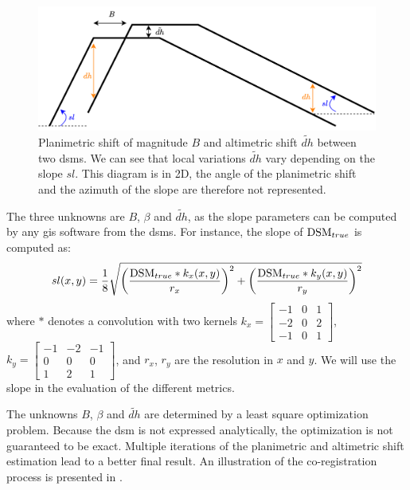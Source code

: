 \begin{figure}[ht!]
    \centering
    \includegraphics[width=\linewidth]{Images/Chap_6/Coregistration.png}
    \caption{Planimetric shift of magnitude $B$ and altimetric shift $\tilde{dh}$ between two \acrshort{dsm}s. We can see that local variations $\tilde{dh}$ vary depending on the slope $sl$. This diagram is in 2D, the angle of the planimetric shift and the azimuth of the slope are therefore not represented.}
    \label{fig:coregistration}
\end{figure}

The three unknowns are $B$, $\beta$ and $\tilde{dh}$, as the slope parameters can be computed by any \acrshort{gis} software from the \acrshort{dsm}s. For instance, the slope of $\mathrm{DSM}_{true}$ is computed as:
\begin{align}\label{eq:slope}
    sl(x,y) = \dfrac{1}{8}\sqrt{\left(\dfrac{\mathrm{DSM}_{true}\ast k_x(x,y)}{r_x}\right)^2 + \left(\dfrac{\mathrm{DSM}_{true}\ast k_y(x,y)}{r_y}\right)^2}
\end{align}
where $\ast$ denotes a convolution with two kernels $k_x=\begin{bmatrix}
-1 & 0 & 1\\
-2 & 0 & 2 \\
-1 & 0 & 1
\end{bmatrix}$, $k_y=\begin{bmatrix}
-1 & -2 & -1\\
0 & 0 & 0 \\
1 & 2 & 1
\end{bmatrix}$, and $r_x$, $r_y$ are the resolution in $x$ and $y$. We will use the slope in the evaluation of the different metrics.

The unknowns $B$, $\beta$ and $\tilde{dh}$ are determined by a least square optimization problem. Because the \acrshort{dsm} is not expressed analytically, the optimization is not guaranteed to be exact. Multiple iterations of the planimetric and altimetric shift estimation lead to a better final result. An illustration of the co-registration process is presented in .

